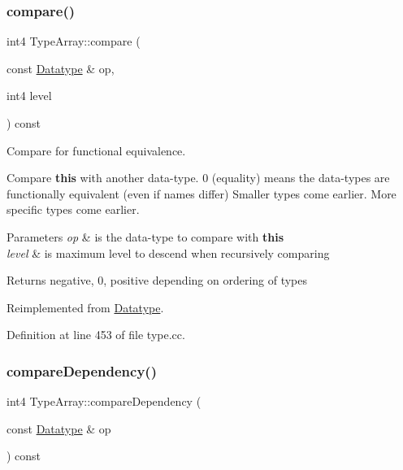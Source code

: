 \subsubsection{\texorpdfstring{compare()}{compare()}}
{\footnotesize\ttfamily int4 Type\+Array\+::compare (\begin{DoxyParamCaption}\item[{const \mbox{\hyperlink{class_datatype}{Datatype}} \&}]{op,  }\item[{int4}]{level }\end{DoxyParamCaption}) const\hspace{0.3cm}{\ttfamily [virtual]}}



Compare for functional equivalence. 

Compare {\bfseries{this}} with another data-\/type. 0 (equality) means the data-\/types are functionally equivalent (even if names differ) Smaller types come earlier. More specific types come earlier. 
\begin{DoxyParams}{Parameters}
{\em op} & is the data-\/type to compare with {\bfseries{this}} \\
\hline
{\em level} & is maximum level to descend when recursively comparing \\
\hline
\end{DoxyParams}
\begin{DoxyReturn}{Returns}
negative, 0, positive depending on ordering of types 
\end{DoxyReturn}


Reimplemented from \mbox{\hyperlink{class_datatype_a4d5a102b2d909180c3080fdb55d7b305}{Datatype}}.



Definition at line 453 of file type.\+cc.

\mbox{\label{class_type_array_a10550a6f660c7c7a4f06ca00eae2319f}} 
\subsubsection{\texorpdfstring{compareDependency()}{compareDependency()}}
{\footnotesize\ttfamily int4 Type\+Array\+::compare\+Dependency (\begin{DoxyParamCaption}\item[{const \mbox{\hyperlink{class_datatype}{Datatype}} \&}]{op }\end{DoxyParamCaption}) const\hspace{0.3cm}{\ttfamily [virtual]}}



